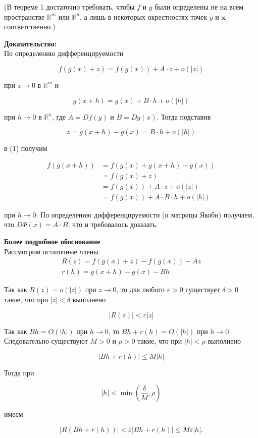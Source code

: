 \documentclass[a4paper,12pt]{article} %
\begin{document}
(В теореме 1 достаточно требовать, чтобы $f$ и $g$ были определены не на всём пространстве $\mathbb{R}^{m}$ или $\mathbb{R}^{n}$, а лишь в некоторых окрестностях точек $y$ и $\boldsymbol{x}$ соответственно.)

\textbf{Доказательство:}\\
По определению дифференцируемости

$$
f(g(x)+z)=f(g(x))+A \cdot z+o(|z|)
$$

при $z \rightarrow 0$ в $\mathbb{R}^{m}$ и

$$
g(x+h)=g(x)+B \cdot h+o(|h|)
$$

при $h \rightarrow 0$ в $\mathbb{R}^{n}$, где $A=D f(y)$ и $B=D g(x)$. Тогда подставив

$$
z=g(x+h)-g(x)=B \cdot h+o(|h|)
$$

в (1) получим

$$
\begin{aligned}
f(g(x+h)) & =f(g(x)+g(x+h)-g(x)) \\
& =f(g(x)+z) \\
& =f(g(x))+A \cdot z+o(|z|) \\
& =f(g(x))+A \cdot B \cdot h+o(|h|)
\end{aligned}
$$

при $h \rightarrow 0$. По определению дифференцируемости (и матрицы Якоби) получаем, что $D \Phi(x)=A \cdot B$, что и требовалось доказать.

\textbf{Более подробное обоснование}\\
Рассмотрим остаточные члены
$$
\begin{gathered}
R(z)=f(g(x)+z)-f(g(x))-A z \\
r(h)=g(x+h)-g(x)-B h
\end{gathered}
$$

Так как $R(z)=o(|z|)$ при $z \rightarrow 0$, то для любого $\varepsilon>0$ существует $\delta>0$ такое, что при $|z|<\delta$ выполнено

$$
|R(z)|<\varepsilon|z|
$$

Так как $B h=O(|h|)$ при $h \rightarrow 0$, то $B h+r(h)=O(|h|)$ при $h \rightarrow 0$. Следовательно существуют $M>0$ и $\rho>0$ такие, что при $|h|<\rho$ выполнено

$$
|B h+r(h)| \leq M|h|
$$

Тогда при

$$
|h|<\min \left(\frac{\delta}{M}, \rho\right)
$$

имеем

$$
|R(B h+r(h))|<\varepsilon|B h+r(h)| \leq M \varepsilon|h| .
$$
\end{document}
